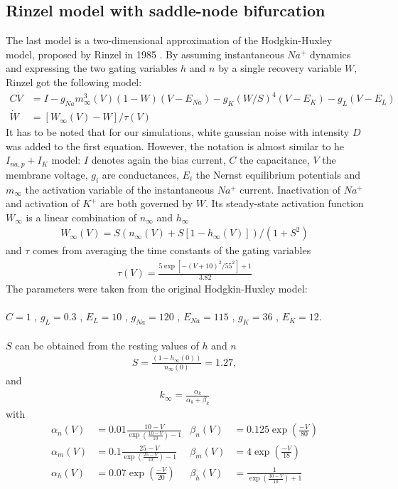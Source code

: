 \documentclass[12pt,a4paper]{article}
\begin{document}
\subsection{Rinzel model with saddle-node bifurcation}
The last model is a two-dimensional approximation of the Hodgkin-Huxley model, proposed by Rinzel in 1985 \cite{rinzel}. By assuming instantaneous $Na^+$ dynamics and expressing the two gating variables $h$ and $n$ by a single recovery variable $W$, Rinzel got the following model:
\begin{align*}
C\dot{V}&=I-g_{Na}m_\infty^3(V)(1-W)(V-E_{Na})-g_K(W/S)^4(V-E_K)-g_L(V-E_L)\\
\dot{W}&=\left[W_\infty(V)-W\right]/\tau(V)
\end{align*}
It has to be noted that for our simulations, white gaussian noise with intensity $D$ was added to the first equation.
However, the notation is almost similar to he $I_{na,p}+I_K$ model: $I$ denotes again the bias current, $C$ the capacitance, $V$ the membrane voltage, $g_i$ are conductances, $E_i$ the Nernst equilibrium potentials and $m_{\infty}$ the activation variable of the instantaneous $Na^+$ current. Inactivation of $Na^+$ and activation of $K^+$ are both governed by $W$. Its steady-state activation function $W_\infty$ is a linear combination of $n_\infty$ and $h_\infty$
\begin{align*}
W_\infty(V)=S\left(n_\infty(V)+S\left[1-h_\infty(V)\right]\right)/(1+S^2)\end{align*}
and $\tau$ comes from averaging the time constants of the gating variables
\begin{align*}
\tau(V)=\frac{5\exp[-(V+10)^2/55^2 ]+1}{3.82}
\end{align*}
The parameters were taken from the original Hodgkin-Huxley model:\\\\
$C=1$ , $g_L=0.3$ , $E_L=10$ , $g_{Na}=120$ , $E_{Na}=115$ , $g_K=36$ , $E_K=12$.\\\\
$S$ can be obtained from the resting values of $h$ and $n$
\begin{align*}
S=\frac{(1-h_\infty(0))}{n_\infty(0)}=1.27,
\end{align*}
and
\begin{align*}
k_\infty=\frac{\alpha_k}{\alpha_k+\beta_k}
\end{align*}
with
\begin{align*}
\alpha_n(V)&=0.01\frac{10-V}{\exp\left(\frac{10-V}{10}\right)-1}
&\beta_n(V)&=0.125\exp\left(\frac{-V}{80}\right)\\
\alpha_m(V)&=0.1\frac{25-V}{\exp\left(\frac{25-V}{10}\right)-1}
&\beta_m(V)&=4\exp\left(\frac{-V}{18}\right)\\
\alpha_h(V)&=0.07\exp\left(\frac{-V}{20}\right)
&\beta_h(V)&=\frac{1}{\exp\left(\frac{30-V}{10}\right)+1}
\end{align*}
\end{document}
